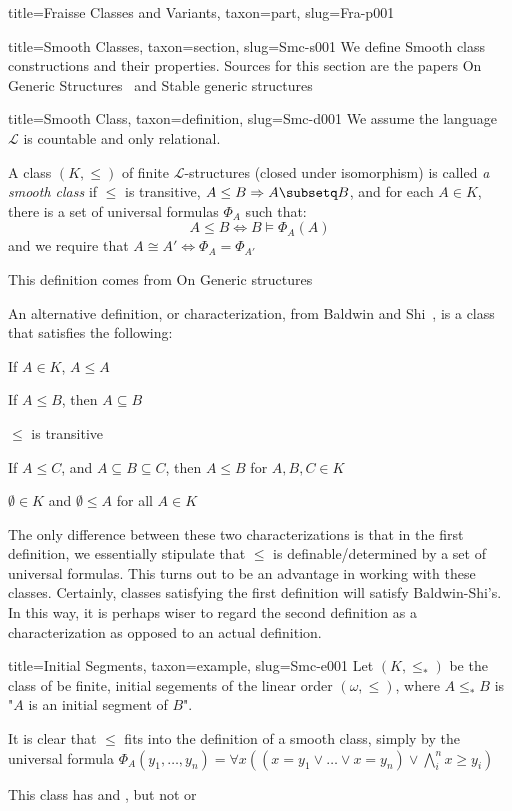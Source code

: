 \documentclass[a4paper]{article}
\begin{document}
\begin{tree}{title={Fraisse Classes and Variants}, taxon={part}, slug={Fra-p001}}
\begin{tree}{title={Smooth Classes}, taxon={section}, slug={Smc-s001}}
We define Smooth class constructions and their properties. Sources for this section are the papers On Generic Structures~\cite{Smc-r001} and Stable generic structures~\cite{Smc-r002}
\begin{tree}{title={Smooth Class}, taxon={definition}, slug={Smc-d001}}
We assume the language \(\mathcal {L}\) is countable and only relational.\par{A class \((K, \leq )\) of finite \(\mathcal {L}\)-structures (closed under isomorphism) is called \emph{a smooth class} if \(\leq\) is transitive, \(A \leq  B  \Rightarrow  A \subsetq  B\), and for each \(A \in  K\), there is a set of universal formulas \(\Phi _A\) such that:
\[A \leq  B  \Leftrightarrow  B \models   \Phi _A(A)\]
and we require that \(A \cong  A'  \Leftrightarrow   \Phi _A =  \Phi _{A'}\)}\par{This definition comes from On Generic structures~\cite{Smc-r001}}\par{An alternative definition, or characterization, from Baldwin and Shi~\cite{Smc-r002}, is a class that satisfies the following:}\par{If \(A \in  K\), \(A \leq  A\)}\par{If \(A \leq  B\), then \(A \subseteq  B\)}\par{\(\leq\) is transitive}\par{If \(A \leq  C\), and \(A \subseteq  B \subseteq  C\), then \(A \leq  B\) for \(A,B,C  \in  K\)}\par{\(\emptyset \in  K\) and \(\emptyset   \leq  A\) for all \(A \in  K\)}\par{The only difference between these two characterizations is that in the first definition, we essentially stipulate that \(\leq\) is definable/determined by a 
set of universal formulas. This turns out to be an advantage in working with these classes. Certainly, classes satisfying the first definition will satisfy Baldwin-Shi's. In this way,
it is perhaps wiser to regard the second definition as a characterization as opposed to an actual definition.}
\end{tree}

\begin{tree}{title={Initial Segments}, taxon={example}, slug={Smc-e001}}
 Let \((K, \leq _*)\) be the class of be finite, initial segements of the linear order \(( \omega , \leq )\), where \(A \leq _* B\) is "\(A\) is an initial segment of \(B\)".\par{It is clear that \(\leq\) fits into the definition of a smooth class, simply by the universal formula \(\Phi _A(y_1, \dots , y_n) =  \forall  x(( x=y_1 \lor \dots \lor  x=y_n)  \lor   \bigwedge _i^n x \geq  y_i)\)}\par{This class has  and , but not  or }
\end{tree}


\end{tree}
\end{tree}
\end{document}
